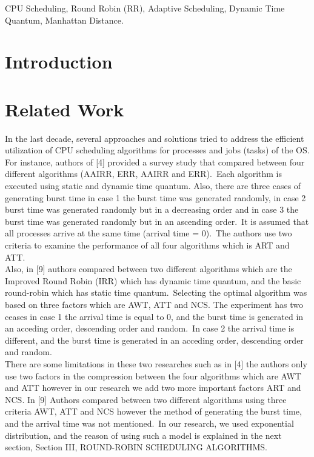 \documentclass[conference]{IEEEtran}
\begin{document}
    \vspace{1em}

    \begin{IEEEkeywords}
        CPU Scheduling, Round Robin (RR), Adaptive Scheduling, Dynamic Time Quantum, Manhattan Distance.
    \end{IEEEkeywords}

    \IEEEpeerreviewmaketitle


    \section{Introduction}
    \label{sec:introduction}
    


    \section{Related Work}
    \label{sec:related-work}
    In the last decade, several approaches and solutions tried to
    address the efficient utilization of CPU scheduling algorithms
    for processes and jobs (tasks) of the OS. For instance, authors
    of [4] provided a survey study that compared between four
    different algorithms (AAIRR, ERR, AAIRR and ERR).~Each
    algorithm is executed using static and dynamic time quantum.
    Also, there are three cases of generating burst time in case 1
    the burst time was generated randomly, in case 2 burst time
    was generated randomly but in a decreasing order and in case
    3 the burst time was generated randomly but in an ascending
    order.~It is assumed that all processes arrive at the same time
    (arrival time = 0).~The authors use two criteria to examine the
    performance of all four algorithms which is ART and ATT.\\

    Also, in [9] authors compared between two different
    algorithms which are the Improved Round Robin (IRR) which
    has dynamic time quantum, and the basic round-robin which
    has static time quantum.~Selecting the optimal algorithm was
    based on three factors which are AWT, ATT and NCS. The
    experiment has two ceases in case 1 the arrival time is equal
    to 0, and the burst time is generated in an acceding order,
    descending order and random.~In case 2 the arrival time is
    different, and the burst time is generated in an acceding order,
    descending order and random.\\

    There are some limitations in these two researches such
    as in [4] the authors only use two factors in the compression
    between the four algorithms which are AWT and ATT however
    in our research we add two more important factors ART
    and NCS. In [9] Authors compared between two different
    algorithms using three criteria AWT, ATT and NCS however
    the method of generating the burst time, and the arrival time
    was not mentioned.~In our research, we used exponential
    distribution, and the reason of using such a model is explained in
    the next section, Section III, ROUND-ROBIN SCHEDULING
    ALGORITHMS.\@
\end{document}
